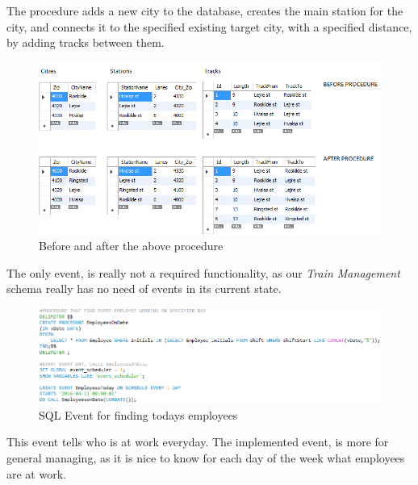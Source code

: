 The procedure adds a new city to the database, creates the main station for the 
city, and connects it to the specified existing target city, with a specified 
distance, by adding tracks between them.

\begin{figure}[ht!]
    \centering
    \includegraphics[width=1\textwidth]{img/SQL_PROCEDURE_AddCityConnect_example}
    \caption{Before and after the above procedure}
\end{figure}

The only event, is really not a required functionality, as our \emph{Train 
Management} schema really has no need of events in its current state. 

\begin{figure}[ht!]
    \centering
    \includegraphics[width=1\textwidth]{img/SQL_EVENT}
    \caption{SQL Event for finding todays employees}
\end{figure}

This event tells who is at work everyday.
The implemented event, is more for general managing, as it is nice to know for 
each day of the week what employees are at work.
